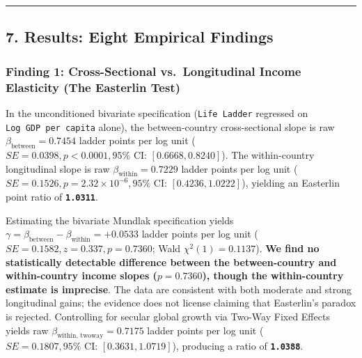 \documentclass[
]{article}
\begin{document}
\begin{center}\rule{0.5\linewidth}{0.5pt}\end{center}

\hypertarget{results-eight-empirical-findings}{%
\subsection{7. Results: Eight Empirical
Findings}\label{results-eight-empirical-findings}}

\hypertarget{finding-1-cross-sectional-vs.-longitudinal-income-elasticity-the-easterlin-test}{%
\subsubsection{Finding 1: Cross-Sectional vs.~Longitudinal Income
Elasticity (The Easterlin
Test)}\label{finding-1-cross-sectional-vs.-longitudinal-income-elasticity-the-easterlin-test}}

In the unconditioned bivariate specification (\texttt{Life\ Ladder}
regressed on \texttt{Log\ GDP\ per\ capita} alone), the between-country
cross-sectional slope is raw \(\beta_{\text{between}} = 0.7454\) ladder
points per log unit
(\(SE = 0.0398, p < 0.0001, 95\% \text{ CI: } [0.6668, 0.8240]\)). The
within-country longitudinal slope is raw
\(\beta_{\text{within}} = 0.7229\) ladder points per log unit
(\(SE = 0.1526, p = 2.32 \times 10^{-6}, 95\% \text{ CI: } [0.4236, 1.0222]\)),
yielding an Easterlin point ratio of \textbf{\texttt{1.0311}}.

Estimating the bivariate Mundlak specification yields
\(\gamma = \beta_{\text{between}} - \beta_{\text{within}} = +0.0533\)
ladder points per log unit (\(SE = 0.1582, z = 0.337, p = 0.7360\); Wald
\(\chi^2(1) = 0.1137\)). \textbf{We find no statistically detectable
difference between the between-country and within-country income slopes
(\(p = 0.7360\)), though the within-country estimate is imprecise}. The
data are consistent with both moderate and strong longitudinal gains;
the evidence does not license claiming that Easterlin's paradox is
rejected. Controlling for secular global growth via Two-Way Fixed
Effects yields raw \(\beta_{\text{within, twoway}} = 0.7175\) ladder
points per log unit
(\(SE = 0.1807, 95\% \text{ CI: } [0.3631, 1.0719]\)), producing a ratio
of \textbf{\texttt{1.0388}}.
\end{document}

